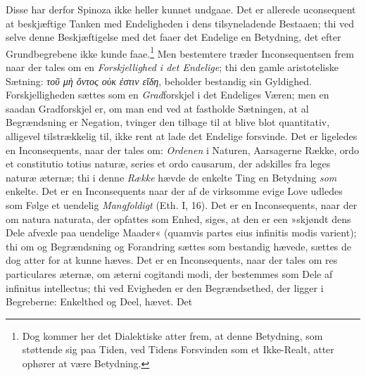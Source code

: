 \documentclass[12pt,a4paper]{book}
\begin{document}
Disse har derfor Spinoza ikke heller kunnet undgaae. Det er allerede
uconsequent at beskjæftige Tanken med Endeligheden i dens
tilsyneladende Bestaaen; thi ved selve denne Beskjæftigelse med det
faaer det Endelige en Betydning, det efter Grundbegrebene ikke kunde
faae.\footnote{Dog kommer her det Dialektiske atter frem, at denne
Betydning, som støttende sig paa Tiden, ved Tidens Forsvinden som et
Ikke-Realt, atter ophører at være Betydning.} Men bestemtere træder
Inconsequentsen frem naar der tales om en \emph{Forskjellighed i det
Endelige}; thi den gamle aristoteliske Sætning: \textit{τοῦ μὴ ὄντος
οὐκ ἐστιν εἴδη}, beholder bestandig sin Gyldighed.
Forskjelligheden sættes som en \emph{Grad}forskjel i det Endeliges Væren; men
en saadan Gradforskjel er, om man end ved at fastholde Sætningen, at
al Begrændsning er Negation, tvinger den tilbage til at blive blot
quantitativ, alligevel tilstrækkelig til, ikke rent at lade det
Endelige forsvinde. Det er ligeledes en Inconsequents, naar der tales
om: \emph{Ordenen} i Naturen, Aarsagerne Række, ordo et constitutio totius
naturæ, series et ordo causarum, der adskilles fra leges naturæ
æternæ; thi i denne \emph{Række} hævde de enkelte Ting en Betydning \emph{som}
enkelte. Det er en Inconsequents naar der af de virksomme evige Love
udledes som Følge et uendelig \emph{Mangfoldigt} (Eth. I, 16). Det er en
Inconsequents, naar der om natura naturata, der opfattes som Enhed,
siges, at den er een »skjøndt dens Dele afvexle paa uendelige
Maader« (quamvis partes eius infinitis modis varient); thi om og
Begrændsning og Forandring sættes som bestandig hævede, sættes de dog
atter for at kunne hæves. Det er en Inconsequents, naar der tales om
res particulares æternæ, om æterni cogitandi modi, der bestemmes som
Dele af infinitus intellectus; thi ved Evigheden er den
Begrændsethed, der ligger i Begreberne: Enkelthed og Deel, hævet. Det
\end{document}
